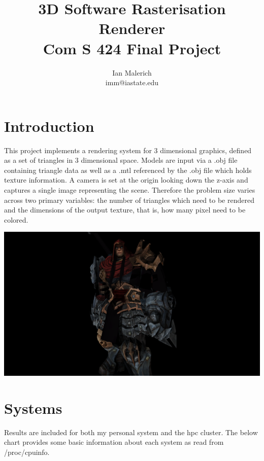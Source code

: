 \documentclass[12pt]{article}
\title{3D Software Rasterisation Renderer \\ \large Com S 424 Final Project}
\author{Ian Malerich \\ imm@iastate.edu}
\begin{document}
\raggedright

\maketitle

\section*{Introduction}

This project implements a rendering system for 3 dimensional graphics, defined as a set
of triangles in 3 dimensional space. Models are input via a .obj file containing triangle data
as well as a .mtl referenced by the .obj file which holds texture information. A camera is set
at the origin looking down the z-axis and captures a single image representing the scene.
Therefore the problem size varies across two primary variables: the number of triangles which
need to be rendered and the dimensions of the output texture, that is, how many pixel need
to be colored.

\bigbreak
\begin{center}
	\includegraphics[scale=0.13]{war.png}
\end{center}

\clearpage
\section*{Systems}

Results are included for both my personal system and the hpc cluster. The below chart provides some basic
information about each system as read from /proc/cpuinfo.
\end{document}
